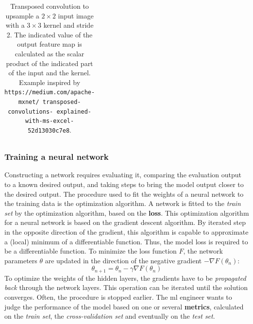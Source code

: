 \begin{table}
\begin{tabular}{llllllllllllllllllll}
        \end{tabular}
\caption{Transposed convolution to upsample a $2\times 2$ input image with a $3\times 3$ kernel and stride 2. 
The indicated value of the output feature map is calculated as the scalar product of the indicated part of the input and the kernel.
Example inspired by \texttt{https://medium.com/apache-mxnet/ transposed-convolutions- explained-with-ms-excel-52d13030c7e8}.}
\end{table}

\subsubsection{Training a neural network}

\par{
    Constructing a network requires evaluating it, comparing the evaluation output to a known desired output, and taking steps to bring the model output closer to the desired output. 
    The procedure used to fit the weights of a neural network to the training data is the optimization algorithm.
    A network is fitted to the \textit{train set} by the optimization algorithm, based on the \textbf{loss}.
    This optimization algorithm for a neural network is based on the gradient descent algorithm. 
    By iterated step in the opposite direction of the gradient, this algorithm is capable to approximate a (local) minimum of a differentiable function.
    Thus, the model loss is required to be a differentiable function.
    To minimize the loss function $F$, the network parameters $\theta$ are updated in the direction of the negative gradient $-\nabla F(\theta_n)$:
    \begin{equation}
        \theta_{n+1} = \theta_n - \gamma \nabla F(\theta_n) \label{eq:gradDesc}
    \end{equation}
    To optimize the weights of the hidden layers, the gradients have to be \textit{propagated back} through the network layers.
    This operation can be iterated until the solution converges. Often, the procedure is stopped earlier.
    The \acrshort{ml} engineer wants to judge the performance of the model based on one or several \textbf{metrics}, calculated on the \textit{train set}, 
    the \textit{cross-validation set} and eventually on the \textit{test set}.
}
